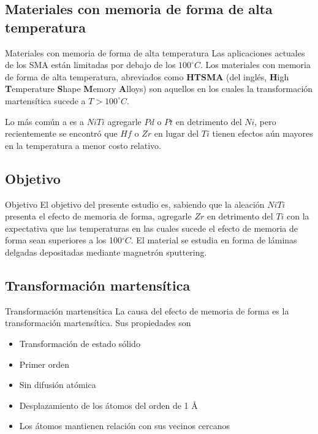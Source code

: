 \documentclass[11pt]{beamer}
\begin{document}
	\subsection{Materiales con memoria de forma de alta temperatura}
		\begin{frame}{Materiales con memoria de forma de alta temperatura}
			Las aplicaciones actuales de los SMA están limitadas por debajo de los $100^\circ C$. Los materiales con memoria de forma de alta temperatura, abreviados como \textbf{HTSMA} (del inglés, \textbf{H}igh \textbf{T}emperature \textbf{S}hape \textbf{M}emory \textbf{A}lloys) son aquellos en los cuales la transformación martensítica sucede a $T > 100^\circ C$.
			
			Lo más común a es a $NiTi$ agregarle $Pd$ o $Pt$ en detrimento del $Ni$, pero recientemente se encontró que $Hf$ o $Zr$ en lugar del $Ti$ tienen efectos aún mayores en la temperatura a menor costo relativo.
		\end{frame}
		
	\subsection{Objetivo}
		\begin{frame}{Objetivo}
			El objetivo del presente estudio es, sabiendo que la aleación $NiTi$ presenta el efecto de memoria de forma, agregarle $Zr$ en detrimento del $Ti$ con la expectativa que las temperaturas en las cuales sucede el efecto de memoria de forma sean superiores a los 100$^\circ C$. El material se estudia en forma de láminas delgadas depositadas mediante magnetrón sputtering.
		\end{frame}
	
	\subsection{Transformación martensítica}
		\begin{frame}{Transformación martensítica}
			La causa del efecto de memoria de forma es la transformación martensítica.
			Sus propiedades son
			\begin{itemize}
				\item Transformación de estado sólido
				\item Primer orden
				\item Sin difusión atómica
				\item Desplazamiento de los átomos del orden de 1 \AA
				\item Los átomos mantienen relación con sus vecinos cercanos
			\end{itemize}
		\end{frame}
		
\end{document}
